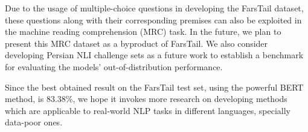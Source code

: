 \documentclass[preprint,12pt]{elsarticle}
\begin{document}
Due to the usage of multiple-choice questions in developing the FarsTail dataset, these questions along with their corresponding premises can also be exploited in the machine reading comprehension (MRC) task. In the future, we plan to present this MRC dataset as a byproduct of FarsTail. We also consider developing Persian NLI challenge sets as a future work to establish a benchmark for evaluating the models' out-of-distribution performance. 

Since the best obtained result on the FarsTail test set, using the powerful BERT method, is 83.38\%, we hope it invokes more research on developing methods which are applicable to real-world NLP tasks in different languages, specially data-poor ones. 

 

\end{document}
